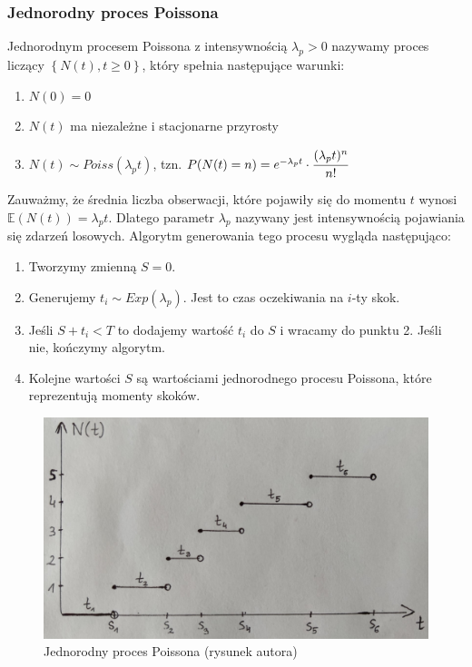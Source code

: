 \documentclass[12pt]{mwart}
\begin{document}
	
	
	
	\subsubsection{Jednorodny proces Poissona}
	\noindent Jednorodnym procesem Poissona z intensywnością $\lambda_{p}>0$ nazywamy proces liczący $\left\lbrace N(t), t \geq 0 \right\rbrace $, który spełnia następujące warunki:
	
	\begin{enumerate}
	\itemsep 1mm
		\item $N(0)=0$
		\item $N(t)$ ma niezależne i stacjonarne przyrosty
		\item $N(t) \sim Poiss(\lambda_{p} t)$, tzn. $P(N(t)=n)=e^{-\lambda_{p} t} \cdot \cfrac{(\lambda_{p} t)^{n}}{n!}$
	\end{enumerate}
	
	\noindent Zauważmy, że średnia liczba obserwacji, które pojawiły się do momentu $t$ wynosi $\mathbb{E}(N(t))=\lambda_{p} t$. Dlatego parametr $\lambda_{p}$ nazywany jest intensywnością pojawiania się zdarzeń losowych. Algorytm generowania tego procesu wygląda następująco:
	
	\begin{enumerate}
	\itemsep 1mm
		\item Tworzymy zmienną $S=0$.
		\item Generujemy $t_i \sim Exp(\lambda_{p})$. Jest to czas oczekiwania na $i$-ty skok.
		\item Jeśli $S+t_i<T$ to dodajemy wartość $t_i$ do $S$ i wracamy do punktu 2. Jeśli nie, kończymy algorytm.
		\item Kolejne wartości $S$ są wartościami jednorodnego procesu Poissona, które reprezentują momenty skoków.
	\end{enumerate}
	
	\begin{figure}[H]
	\begin{center}
		\includegraphics[scale=0.25]{proces_poissona.jpg}
		\caption{Jednorodny proces Poissona (rysunek autora)}
	\end{center}
	\end{figure}
	
\end{document}
